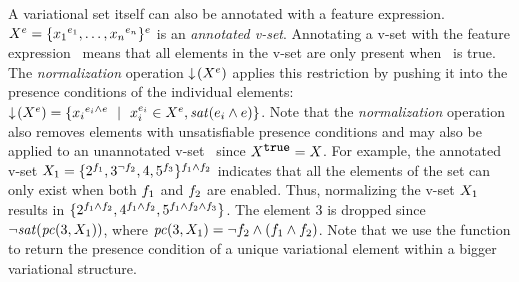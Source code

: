 A variational set itself can also be annotated with a feature expression.
%
$\annot \vset = \setDef {\annot [\dimMeta_1] {\elem_1},\ldots,\annot [\dimMeta_n] {\elem_n}}^\dimMeta$ is an
\emph{annotated v-set}.
Annotating a v-set with the feature expression \dimMeta\ means that all
elements in the v-set are only present when \dimMeta\ is true.
The \emph{normalization} operation $\pushIn {\annot \vset}$ applies this
restriction by pushing it into the presence conditions of the individual
elements:
\ensuremath{
\pushIn {\annot \vset}
= 
\setDef{\annot [\dimMeta_i \wedge \dimMeta] {\elem_i} \myOR 
\annot [\dimMeta_i] \elem_i \in \annot \vset, \sat {\dimMeta_i \wedge \dimMeta}
}
}.
Note that the \emph{normalization} operation also removes elements
with unsatisfiable presence conditions and may also be applied
to an unannotated v-set \vset\ since $\annot[\t]{\vset} = \vset$.
%
For example, the annotated v-set
$\vset_1 = \{\annot [\A] 2, \annot [\neg \B] 3, 4, \annot [\C] 5\}^{\A \wedge \B}$
indicates that all the elements of the set can only exist
when both $\A$ and $\B$ are enabled. Thus, normalizing the v-set $\vset_1$
results in
$\{\annot [\A \wedge \B] 2,\annot [\A \wedge \B] 4,\annot [\A \wedge \B \wedge \C] 5\}$. The element $3$ is dropped 
since 
\ensuremath{\neg \sat {\getPCfrom 3 {\vset_1} }},
where
\ensuremath{
{\getPCfrom 3 {\vset_1} } = \neg \B \wedge (\A \wedge \B)}.
Note that we use the function \getPCfrom \elem {\annot \vset} to 
return the presence condition of a unique variational element within a bigger
variational structure.

